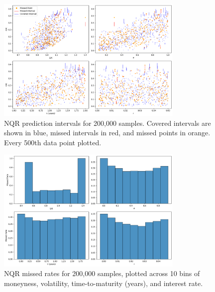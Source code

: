 \documentclass{article}
\theoremstyle{definition}
\begin{document}
\begin{figure}
    \centering
    \includegraphics[width=0.8\textwidth]{reports/figures/3.3-nm-figures/sample_5/NQR_PIs_5.png}
    \caption{NQR prediction intervals for 200,000 samples. Covered intervals are shown in blue, missed intervals in red, and missed points in orange. Every 500th data point plotted.}
    \label{fig:NQR_PIs_5}
\end{figure}

\begin{figure}
    \centering
    \includegraphics[width=0.8\textwidth]{reports/figures/3.3-nm-figures/sample_5/NQR_MISSED_RATE_5.png}
    \caption{NQR missed rates for 200,000 samples, plotted across 10 bins of moneyness, volatility, time-to-maturity (years), and interest rate.}
    \label{fig:NQR_MISSED_RATE_5}
\end{figure}

\end{document}
